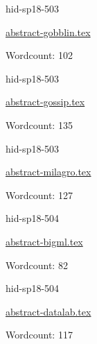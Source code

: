 

\begin{IU}

hid-sp18-503

\href{https://github.com/cloudmesh-community/hid-sp18-503/blob/master//technology/abstract-gobblin.tex}{abstract-gobblin.tex}

 

Wordcount: 102

\end{IU}



\begin{IU}

hid-sp18-503

\href{https://github.com/cloudmesh-community/hid-sp18-503/blob/master//technology/abstract-gossip.tex}{abstract-gossip.tex}

 

Wordcount: 135

\end{IU}



\begin{IU}

hid-sp18-503

\href{https://github.com/cloudmesh-community/hid-sp18-503/blob/master//technology/abstract-milagro.tex}{abstract-milagro.tex}

 

Wordcount: 127

\end{IU}



\begin{IU}

hid-sp18-504

\href{https://github.com/cloudmesh-community/hid-sp18-504/blob/master//technology/abstract-bigml.tex}{abstract-bigml.tex}

 

Wordcount: 82

\end{IU}



\begin{IU}

hid-sp18-504

\href{https://github.com/cloudmesh-community/hid-sp18-504/blob/master//technology/abstract-datalab.tex}{abstract-datalab.tex}

 

Wordcount: 117

\end{IU}

